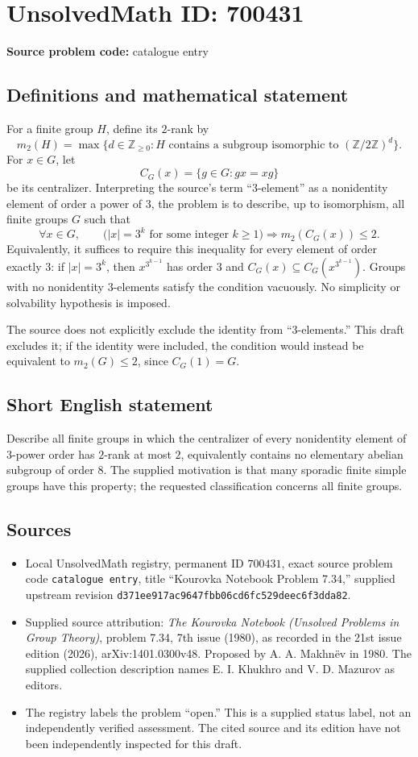 \documentclass[11pt]{article}
\newcommand{\Z}{\mathbb{Z}}
\begin{document}
\section*{UnsolvedMath ID: 700431}
\textbf{Source problem code:} catalogue entry
\subsection{Definitions and mathematical statement}
For a finite group \(H\), define its \(2\)-rank by
\[
m_2(H)=\max\{d\in\Z_{\geq 0}: H\text{ contains a subgroup isomorphic to }(\Z/2\Z)^d\}.
\]
For \(x\in G\), let
\[
C_G(x)=\{g\in G:gx=xg\}
\]
be its centralizer. Interpreting the source's term ``\(3\)-element'' as a nonidentity element of order a power of \(3\), the problem is to describe, up to isomorphism, all finite groups \(G\) such that
\[
\forall x\in G,\qquad
\bigl(|x|=3^k\text{ for some integer }k\geq1\bigr)
\Longrightarrow m_2(C_G(x))\leq2.
\]
Equivalently, it suffices to require this inequality for every element of order exactly \(3\): if \(|x|=3^k\), then \(x^{3^{k-1}}\) has order \(3\) and \(C_G(x)\subseteq C_G(x^{3^{k-1}})\). Groups with no nonidentity \(3\)-elements satisfy the condition vacuously. No simplicity or solvability hypothesis is imposed.

The source does not explicitly exclude the identity from ``\(3\)-elements.'' This draft excludes it; if the identity were included, the condition would instead be equivalent to \(m_2(G)\leq2\), since \(C_G(1)=G\).
\subsection{Short English statement}
Describe all finite groups in which the centralizer of every nonidentity element of \(3\)-power order has \(2\)-rank at most \(2\), equivalently contains no elementary abelian subgroup of order \(8\). The supplied motivation is that many sporadic finite simple groups have this property; the requested classification concerns all finite groups.
\subsection{Sources}
\begin{itemize}
\item Local UnsolvedMath registry, permanent ID \(700431\), exact source problem code \texttt{catalogue entry}, title ``Kourovka Notebook Problem 7.34,'' supplied upstream revision \texttt{d371ee917ac9647fbb06cd6fc529deec6f3dda82}.
\item Supplied source attribution: \emph{The Kourovka Notebook (Unsolved Problems in Group Theory)}, problem 7.34, 7th issue (1980), as recorded in the 21st issue edition (2026), arXiv:1401.0300v48. Proposed by A. A. Makhn\"ev in 1980. The supplied collection description names E. I. Khukhro and V. D. Mazurov as editors.
\item The registry labels the problem ``open.'' This is a supplied status label, not an independently verified assessment. The cited source and its edition have not been independently inspected for this draft.
\end{itemize}
\end{document}
